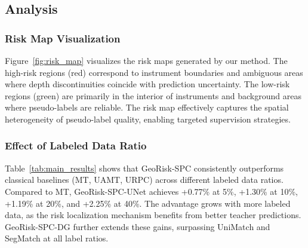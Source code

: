 \documentclass[conference]{IEEEtran}
\begin{document}
%
%
%
%

\subsection{Analysis}

\subsubsection{Risk Map Visualization}
Figure~\ref{fig:risk_map} visualizes the risk maps generated by our method. The high-risk regions (red) correspond to instrument boundaries and ambiguous areas where depth discontinuities coincide with prediction uncertainty. The low-risk regions (green) are primarily in the interior of instruments and background areas where pseudo-labels are reliable. The risk map effectively captures the spatial heterogeneity of pseudo-label quality, enabling targeted supervision strategies.

\subsubsection{Effect of Labeled Data Ratio}
Table~\ref{tab:main_results} shows that GeoRisk-SPC consistently outperforms classical baselines (MT, UAMT, URPC) across different labeled data ratios. Compared to MT, GeoRisk-SPC-UNet achieves +0.77\% at 5\%, +1.30\% at 10\%, +1.19\% at 20\%, and +2.25\% at 40\%. The advantage grows with more labeled data, as the risk localization mechanism benefits from better teacher predictions. GeoRisk-SPC-DG further extends these gains, surpassing UniMatch and SegMatch at all label ratios.
\end{document}

